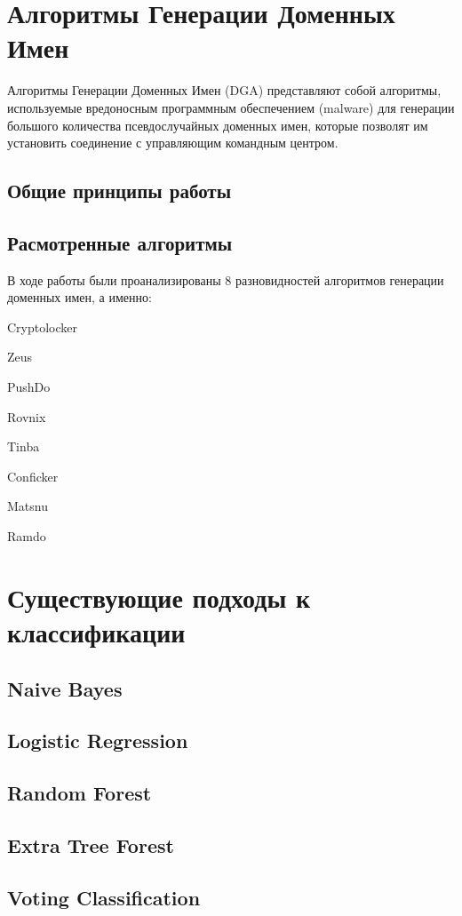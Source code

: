 \section{Алгоритмы Генерации Доменных Имен}
Алгоритмы Генерации Доменных Имен (DGA) представляют собой алгоритмы, используемые вредоносным программным обеспечением (malware) для генерации большого количества псевдослучайных доменных имен, которые позволят им установить соединение с управляющим командным центром.

    \subsection{Общие принципы работы}
    \subsection{Расмотренные алгоритмы}
    В ходе работы были проанализированы 8 разновидностей алгоритмов генерации доменных имен, а именно:
        \item{Cryptolocker}
        \item{Zeus}
        \item{PushDo}
        \item{Rovnix}
        \item{Tinba}
        \item{Conficker}
        \item{Matsnu}
        \item{Ramdo}

\section{Существующие подходы к классификации}
    \subsection{Naive Bayes}
    \subsection{Logistic Regression}
    \subsection{Random Forest}
    \subsection{Extra Tree Forest}
    \subsection{Voting Classification}
\clearpage

